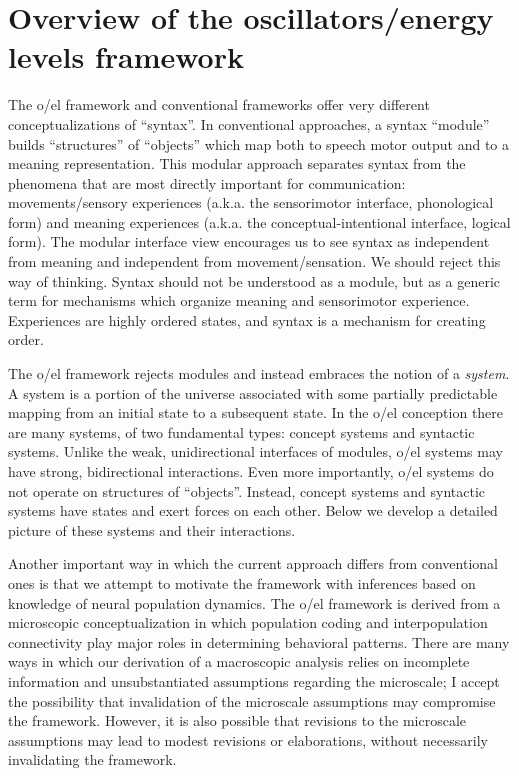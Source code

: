 \chapter{Overview of the oscillators/energy levels framework}
The o/el framework and conventional frameworks offer very different conceptualizations of “syntax”. In conventional approaches, a syntax “module” builds “structures” of “objects” which map both to speech motor output and to a meaning representation. This modular approach separates syntax from the phenomena that are most directly important for communication: movements/sensory experiences (a.k.a. the sensorimotor interface, phonological form) and meaning experiences (a.k.a. the conceptual-intentional interface, logical form). The modular interface view encourages us to see syntax as independent from meaning and independent from movement/sensation. We should reject this way of thinking. Syntax should not be understood as a module, but as a generic term for mechanisms which organize meaning and sensorimotor experience. Experiences are highly ordered states, and syntax is a mechanism for creating order. 

  The o/el framework rejects modules and instead embraces the notion of a \textit{system}. A system is a portion of the universe associated with some partially predictable mapping from an initial state to a subsequent state. In the o/el conception there are many systems, of two fundamental types: concept systems and syntactic systems. Unlike the weak, unidirectional interfaces of modules, o/el systems may have strong, bidirectional interactions. Even more importantly, o/el systems do not operate on structures of “objects”. Instead, concept systems and syntactic systems have states and exert forces on each other. Below we develop a detailed picture of these systems and their interactions. 

  Another important way in which the current approach differs from conventional ones is that we attempt to motivate the framework with inferences based on knowledge of neural population dynamics. The o/el framework is derived from a microscopic conceptualization in which population coding and interpopulation connectivity play major roles in determining behavioral patterns. There are many ways in which our derivation of a macroscopic analysis relies on incomplete information and unsubstantiated assumptions regarding the microscale; I accept the possibility that invalidation of the microscale assumptions may compromise the framework. However, it is also possible that revisions to the microscale assumptions may lead to modest revisions or elaborations, without necessarily invalidating the framework.

